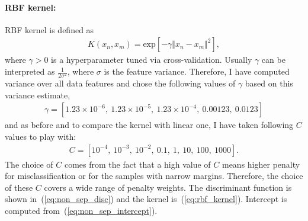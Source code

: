 \paragraph{RBF kernel:} RBF kernel is defined as
\begin{align}\label{eq:rbf_kernel}
K(x_n, x_m) = \text{exp}\left[-\gamma \Vert x_n-x_m \Vert^2\right],
\end{align}
where $\gamma > 0$ is a hyperparameter tuned via cross-validation. Usually $\gamma$ can be interpreted as $\frac{1}{2\sigma^2}$, where $\sigma$ is the feature variance. Therefore, I have computed variance over all data features and chose the following values of $\gamma$ based on this variance estimate,
\begin{align*}
\gamma = [1.23\times 10^{-6},\ 1.23\times 10^{-5},\ 1.23\times 10^{-4},\ 0.00123,\ 0.0123]
\end{align*}
and as before and to compare the kernel with linear one, I have taken following $C$ values to play with:
\begin{align*}
C = [10^{-4},\ 10^{-3},\ 10^{-2},\ 0.1,\ 1,\ 10,\ 100,\ 1000].
\end{align*}
The choice of $C$ comes from the fact that a high value of $C$ means higher penalty for misclassification or for the samples with narrow margins. Therefore, the choice of these $C$ covers a wide range of penalty weights.
The discriminant function is shown in~(\ref{eq:non_sep_disc}) and the kernel is~(\ref{eq:rbf_kernel}). Intercept is computed from~(\ref{eq:non_sep_intercept}).
